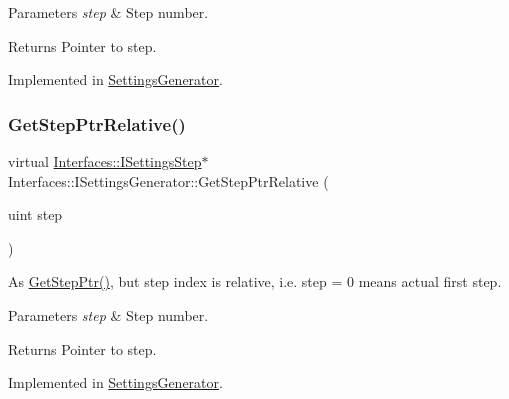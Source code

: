 \begin{DoxyParams}{Parameters}
{\em step} & Step number. \\
\hline
\end{DoxyParams}
\begin{DoxyReturn}{Returns}
Pointer to step. 
\end{DoxyReturn}


Implemented in \hyperlink{class_settings_generator_a37f4175a0ed24853b2f187f15505086b}{Settings\+Generator}.

\mbox{\label{class_interfaces_1_1_i_settings_generator_a8de5944be5295009b7407772bc9b1b3b}} 
\subsubsection{\texorpdfstring{Get\+Step\+Ptr\+Relative()}{GetStepPtrRelative()}}
{\footnotesize\ttfamily virtual \hyperlink{class_interfaces_1_1_i_settings_step}{Interfaces\+::\+I\+Settings\+Step}$\ast$ Interfaces\+::\+I\+Settings\+Generator\+::\+Get\+Step\+Ptr\+Relative (\begin{DoxyParamCaption}\item[{uint}]{step }\end{DoxyParamCaption})\hspace{0.3cm}{\ttfamily [pure virtual]}}



As \hyperlink{class_interfaces_1_1_i_settings_generator_af1b65a18c3ade3235715ae2e9cdbcfe0}{Get\+Step\+Ptr()}, but step index is relative, i.\+e. step = 0 means actual first step. 


\begin{DoxyParams}{Parameters}
{\em step} & Step number. \\
\hline
\end{DoxyParams}
\begin{DoxyReturn}{Returns}
Pointer to step. 
\end{DoxyReturn}


Implemented in \hyperlink{class_settings_generator_aa45d5a3c1349c18ac611ad960ff8470d}{Settings\+Generator}.

\mbox{\label{class_interfaces_1_1_i_settings_generator_a4aa0307e906c003012aad75101072c65}} 
